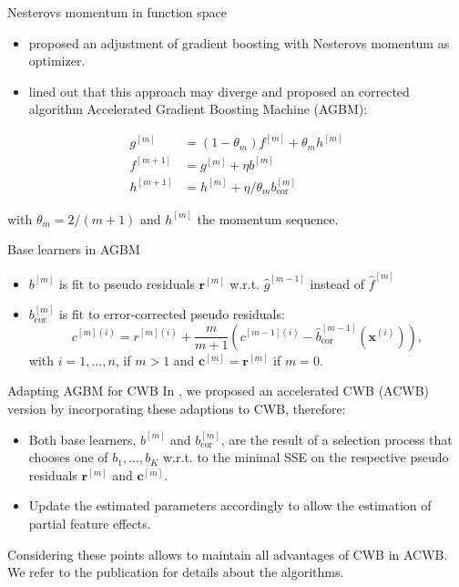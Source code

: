 \documentclass[ignorenonframetext,]{beamer}
\providecommand{\tightlist}{%
  \setlength{\itemsep}{0pt}\setlength{\parskip}{0pt}}
\newcommand{\fh}{\hat{f}}
\newcommand{\fmh}{\fh^{[m]}}
\newcommand{\xv}{\bm{x}}
\newcommand{\pr}{r}
\newcommand{\prv}{\bm{r}}
\newcommand{\rmi}{\pr^{[m](i)}}
\renewcommand{\xi}[1][i]{\xv^{(#1)}}
\newcommand{\rmm}{\prv^{[m]}}
\begin{document}
\begin{frame}{Nesterovs momentum in function space}
\protect\hypertarget{nesterovs-momentum-in-function-space}{}
\begin{itemize}
\tightlist
\item
  \citet{biau2019accelerated} proposed an adjustment of gradient
  boosting with Nesterovs momentum as optimizer.
\item
  \citet{lu2020accelerating} lined out that this approach may diverge
  and proposed an corrected algorithm Accelerated Gradient Boosting
  Machine (AGBM):
\end{itemize}

\vspace{-0.9cm}
\begin{align*}
g^{[m]} &= (1 - \theta_m) f^{[m]} + \theta_m h^{[m]}\\
f^{[m+1]} &= g^{[m]} + \eta b^{[m]} \\
h^{[m+1]} &= h^{[m]} + \eta / \theta_m b^{[m]}_{\text{cor}}
\end{align*}

with \(\theta_m = 2 / (m + 1)\) and \(h^{[m]}\) the momentum sequence.
\end{frame}

\begin{frame}{Base learners in AGBM}
\protect\hypertarget{base-learners-in-agbm}{}
\begin{itemize}
\tightlist
\item
  \(b^{[m]}\) is fit to pseudo residuals \(\rmm\) w.r.t.
  \(\hat{g}^{[m-1]}\) instead of \(\fmh\)
\item
  \(b^{[m]}_{\text{cor}}\) is fit to error-corrected pseudo residuals:
  \[c^{[m](i)} = \rmi + \frac{m}{m+1}(c^{[m-1](i)} - \hat{b}_{\text{cor}}^{[m-1]}(\xi)),\]
  with \(i = 1, \dots, n\), if \(m > 1\) and \(\bm{c}^{[m]} = \rmm\) if
  \(m = 0\).
\end{itemize}
\end{frame}

\begin{frame}{Adapting AGBM for CWB}
\protect\hypertarget{adapting-agbm-for-cwb}{}
In \citet{schalk2022accelerated}, we proposed an accelerated CWB (ACWB)
version by incorporating these adaptions to CWB, therefore:

\begin{itemize}
\tightlist
\item
  Both base learners, \(b^{[m]}\) and \(b^{[m]}_{\text{cor}}\), are the
  result of a selection process that chooses one of \(b_1, \dots, b_K\)
  w.r.t. to the minimal SSE on the respective pseudo residuals \(\rmm\)
  and \(\bm{c}^{[m]}\).
\item
  Update the estimated parameters accordingly to allow the estimation of
  partial feature effects.
\end{itemize}

Considering these points allows to maintain all advantages of CWB in
ACWB. We refer to the publication for details about the algorithms.
\end{frame}
\end{document}
